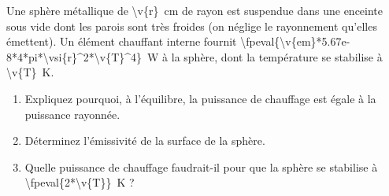 Une sphère métallique de \qty{\v{r}}{cm} de rayon est suspendue dans une enceinte sous vide dont les parois sont très froides (on néglige le rayonnement qu'elles émettent). Un élément chauffant interne fournit \qty[round-mode=figures,round-precision=3]{\fpeval{\v{em}*5.67e-8*4*pi*\vsi{r}^2*\v{T}^4}}{W} à la sphère, dont la température se stabilise à \qty{\v{T}}{K}.

\begin{enumerate}[label=\alph*)]
    \item Expliquez pourquoi, à l'équilibre, la puissance de chauffage est égale à la puissance rayonnée.
    \item Déterminez l'émissivité de la surface de la sphère.
    \item Quelle puissance de chauffage faudrait-il pour que la sphère se stabilise à \qty{\fpeval{2*\v{T}}}{K} ?
\end{enumerate}
